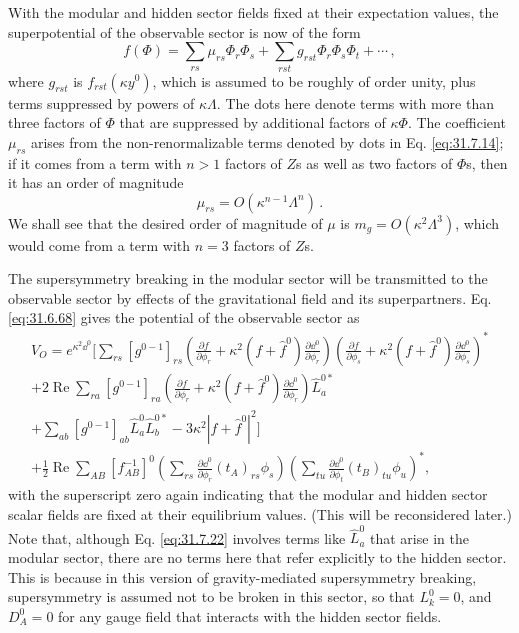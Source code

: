 With the modular and hidden sector fields fixed at their expectation values,
the superpotential of the observable sector is now of the form
\begin{equation}
  f(\Phi)
  =\sum_{rs}\mu_{rs}\Phi_r\Phi_s
   +\sum_{rst}g_{rst}\Phi_r\Phi_s\Phi_t+\cdots\,,
  \tag{31.7.20}\label{eq:31.7.20}
\end{equation}
where \(g_{rst}\) is \(f_{rst}(\kappa y^0)\), which is assumed to be roughly
of order unity, plus terms suppressed by powers of \(\kappa\Lambda\). The
dots here denote terms with more than three factors of \(\Phi\) that are
suppressed by additional factors of \(\kappa\Phi\). The coefficient
\(\mu_{rs}\) arises from the non-renormalizable terms denoted by dots in
Eq. \eqref{eq:31.7.14}; if it comes from a term with \(n>1\) factors of
\(Z\)s as well as two factors of \(\Phi\)s, then it has an order of
magnitude
\begin{equation}
  \mu_{rs}=O(\kappa^{n-1}\Lambda^n)\,.
  \tag{31.7.21}\label{eq:31.7.21}
\end{equation}
We shall see that the desired order of magnitude of \(\mu\) is
\(m_g=O(\kappa^2\Lambda^3)\), which would come from a term with \(n=3\)
factors of \(Z\)s.

The supersymmetry breaking in the modular sector will be transmitted to the
observable sector by effects of the gravitational field and its
superpartners. Eq. \eqref{eq:31.6.68} gives the potential of the observable
sector as
\begin{multline}
  V_O=e^{\kappa^2\dd^0}\Biggl[
  \sum_{rs}[g^{0-1}]_{rs}
  \left(
    \frac{\partial f}{\partial\phi_r}
    +\kappa^2(f+\widehat f^0)\frac{\partial \dd^0}{\partial\phi_r}
  \right)
  \left(
    \frac{\partial f}{\partial\phi_s}
    +\kappa^2(f+\widehat f^0)\frac{\partial \dd^0}{\partial\phi_s}
  \right)^*
  \\
  +2\operatorname{Re}\sum_{ra}[g^{0-1}]_{ra}
  \left(
    \frac{\partial f}{\partial\phi_r}
    +\kappa^2(f+\widehat f^0)\frac{\partial \dd^0}{\partial\phi_r}
  \right)\widehat L_a^{0*}
  \\
  +\sum_{ab}[g^{0-1}]_{ab}\widehat L_a^0\widehat L_b^{0*}
  -3\kappa^2|f+\widehat f^0|^2
  \Biggr]
  \\
  +\frac12\operatorname{Re}\sum_{AB}[f_{AB}^{-1}]^0
  \left(
    \sum_{rs}\frac{\partial \dd^0}{\partial\phi_r}
      (t_A)_{rs}\phi_s
  \right)
  \left(
    \sum_{tu}\frac{\partial \dd^0}{\partial\phi_t}
      (t_B)_{tu}\phi_u
  \right)^*,
  \tag{31.7.22}\label{eq:31.7.22}
\end{multline}
with the superscript zero again indicating that the modular and hidden
sector scalar fields are fixed at their equilibrium values. (This will be
reconsidered later.) Note that, although Eq. \eqref{eq:31.7.22} involves
terms like \(\widehat L_a^0\) that arise in the modular sector, there are no
terms here that refer explicitly to the hidden sector. This is because in
this version of gravity-mediated supersymmetry breaking, supersymmetry is
assumed not to be broken in this sector, so that \(L_k^0=0\), and
\(D_A^0=0\) for any gauge field that interacts with the hidden sector
fields.


